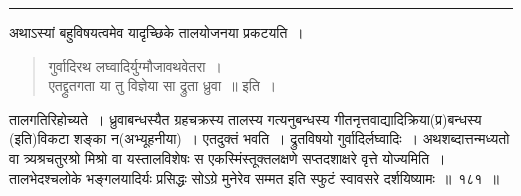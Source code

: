 \documentclass[11pt, openany]{book}
\begin{document}
\hrule

\vspace{2mm}
अथाऽस्यां बहुविषयत्वमेव यादृच्छिके तालयोजनया प्रकटयति~।

\begin{quote}
{\qt गुर्वादिरथ लघ्वादिर्युग्मौजावथवेतरा~।\\
एतद्द्रुतगता या तु विज्ञेया सा द्रुता ध्रुवा~॥} इति~।
\end{quote}

तालगतिरिहोच्यते~। ध्रुवाबन्धस्यैत ग्रहचक्रस्य तालस्य गत्यनुबन्धस्य गीतनृत्तवाद्यादिक्रिया(प्र)बन्धस्य (इति)विकटा शङ्का न(अभ्यूहनीया)~। एतदुक्तं भवति~। द्रुतविषयो {\qtt गुर्वादिर्लघ्वादिः~। अथश}ब्दात्तन्मध्यतो वा त्र्यश्रचतुरश्रो मिश्रो वा यस्तालविशेषः स एकस्मिंस्तूक्तलक्षणे सप्तदशाक्षरे वृत्ते योज्यमिति~। तालभेदश्चलोके भङ्गलयादिर्यः प्रसिद्धः सोऽग्रे {\qtt मुनेरेव} सम्मत इति स्फुटं स्वावसरे {\qtt दर्शयिष्यामः}~॥~१८१~॥

\newpage
\end{document}
